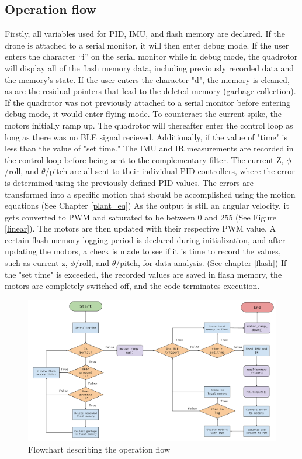 \subsection{Operation flow}

Firstly, all variables used for PID, IMU, and flash memory are declared. If the drone is attached to a serial monitor, it will then enter debug mode. If the user enters the character “i” on the serial monitor while in debug mode, the quadrotor will display all of the flash memory data, including previously recorded data and the memory's state. 
If the user enters the character "d", the memory is cleaned, as are the residual pointers that lead to the deleted memory (garbage collection). If the quadrotor was not previously attached to a serial monitor before entering debug mode, it would enter flying mode. 
To counteract the current spike, the motors initially ramp up. The quadrotor will thereafter enter the control loop as long as there was no BLE signal recieved. Additionally, if the value of "time" is less than the value of "set time." The IMU and IR measurements are recorded in the control loop before being sent to the complementary filter. The current Z, $\phi$/roll, and $\theta$/pitch are all sent to their individual PID controllers, where the error is determined using the previously defined PID values. 
The errors are transformed into a specific motion that should be accomplished using the motion equations (See Chapter \ref{plant_eq}) 
As the output is still an angular velocity, it gets converted to PWM and saturated to be between 0 and 255 (See Figure \ref{linear}). 
The motors are then updated with their respective PWM value. 
A certain flash memory logging period is declared during initialization, and after updating the motors, a check is made to see if it is time to record the values, such as current z, $\phi$/roll, and $\theta$/pitch, for data analysis. (See chapter \ref{flash}) 
If the "set time" is exceeded, the recorded values are saved in flash memory, the motors are completely switched off, and the code terminates execution.

\begin{figure}[!ht]
    \begin{center}
    \includegraphics[width=\textwidth]{pictures/flowchart_pdf.pdf}
    \end{center}
    \caption{Flowchart describing the operation flow}
    \label{fig:flowchart}
\end{figure}